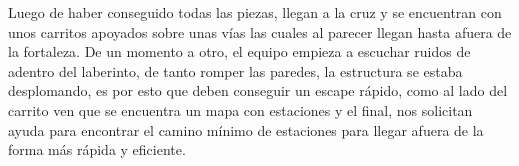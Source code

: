 Luego de haber conseguido todas las piezas, llegan a la cruz y se encuentran con unos carritos apoyados sobre unas v\'ias las cuales al parecer llegan hasta afuera de la fortaleza. De un momento a otro, el equipo empieza a escuchar ruidos de adentro del laberinto, de tanto romper las paredes, la estructura se estaba desplomando, es por esto que deben conseguir un escape r\'apido, como al lado del carrito ven que se encuentra un mapa con estaciones y el final, nos solicitan ayuda para encontrar el camino m\'inimo de estaciones para llegar afuera de la forma m\'as r\'apida y eficiente.